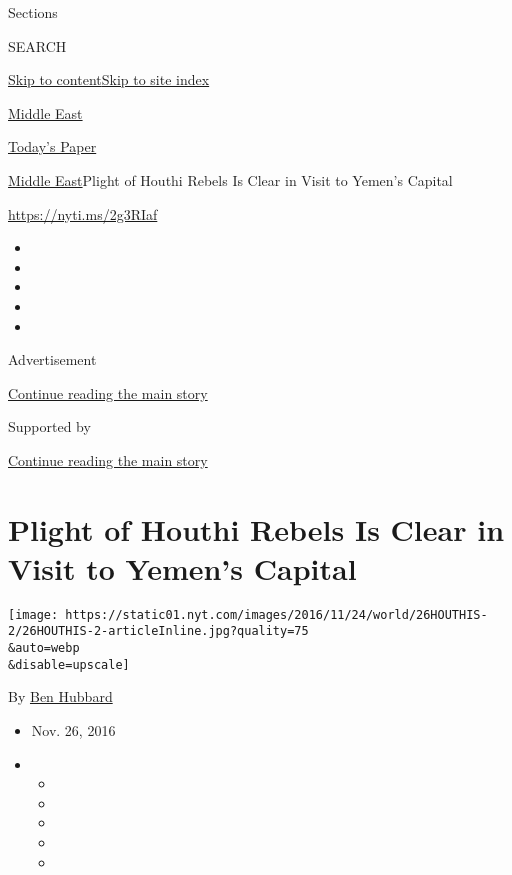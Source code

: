 Sections

SEARCH

\protect\hyperlink{site-content}{Skip to
content}\protect\hyperlink{site-index}{Skip to site index}

\href{https://www.nytimes.com/section/world/middleeast}{Middle East}

\href{https://myaccount.nytimes.com/auth/login?response_type=cookie\&client_id=vi}{}

\href{https://www.nytimes.com/section/todayspaper}{Today's Paper}

\href{/section/world/middleeast}{Middle East}\textbar{}Plight of Houthi
Rebels Is Clear in Visit to Yemen's Capital

\url{https://nyti.ms/2g3RIaf}

\begin{itemize}
\item
\item
\item
\item
\item
\end{itemize}

Advertisement

\protect\hyperlink{after-top}{Continue reading the main story}

Supported by

\protect\hyperlink{after-sponsor}{Continue reading the main story}

\hypertarget{plight-of-houthi-rebels-is-clear-in-visit-to-yemens-capital}{%
\section{Plight of Houthi Rebels Is Clear in Visit to Yemen's
Capital}\label{plight-of-houthi-rebels-is-clear-in-visit-to-yemens-capital}}

\texttt{[image: https://static01.nyt.com/images/2016/11/24/world/26HOUTHIS-2/26HOUTHIS-2-articleInline.jpg?quality=75\\\&auto=webp\\\&disable=upscale]}

By \href{http://www.nytimes.com/by/ben-hubbard}{Ben Hubbard}

\begin{itemize}
\item
  Nov. 26, 2016
\item
  \begin{itemize}
  \item
  \item
  \item
  \item
  \item
  \end{itemize}
\end{itemize}

